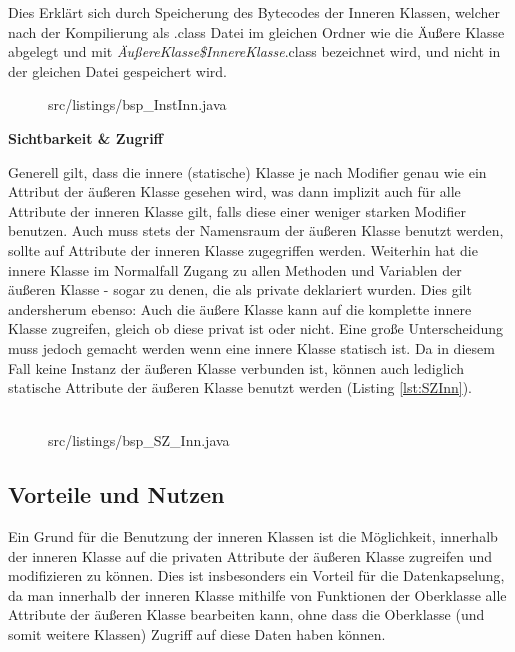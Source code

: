 Dies Erklärt sich durch Speicherung des Bytecodes der Inneren Klassen, welcher nach der Kompilierung als .class Datei im gleichen Ordner wie die Äußere Klasse abgelegt und mit {\it ÄußereKlasse\$InnereKlasse}.class bezeichnet wird, und nicht in der gleichen Datei gespeichert wird.

\begin{figure}[hbt]
\lstset{language=Java}
 {src/listings/bsp_InstInn.java}
\end{figure}

{\bf Sichtbarkeit \& Zugriff}

Generell gilt, dass die innere (statische) Klasse je nach Modifier genau wie ein Attribut der äußeren Klasse gesehen wird, was dann implizit auch für alle Attribute der inneren Klasse gilt, falls diese einer weniger starken Modifier benutzen.
Auch muss stets der Namensraum der äußeren Klasse benutzt werden, sollte auf Attribute der inneren Klasse zugegriffen werden.
Weiterhin hat die innere Klasse im Normalfall Zugang zu allen Methoden und Variablen der äußeren Klasse - sogar zu denen, die als private deklariert wurden.
Dies gilt andersherum ebenso: Auch die äußere Klasse kann auf die komplette innere Klasse zugreifen, gleich ob diese privat ist oder nicht.
Eine große Unterscheidung muss jedoch gemacht werden wenn eine innere Klasse statisch ist. Da in diesem Fall keine Instanz der äußeren Klasse verbunden ist, können auch lediglich statische Attribute der äußeren Klasse benutzt werden (Listing \ref{lst:SZInn}).
\\
\\
\begin{figure}[hbt]
\lstset{language=Java}
 {src/listings/bsp_SZ_Inn.java}
\end{figure}

\subsection{Vorteile und Nutzen}

Ein Grund für die Benutzung der inneren Klassen ist die Möglichkeit, innerhalb der inneren Klasse auf die privaten Attribute der äußeren Klasse zugreifen und modifizieren zu können.
Dies ist insbesonders ein Vorteil für die Datenkapselung, da man innerhalb der inneren Klasse mithilfe von Funktionen der Oberklasse alle Attribute der äußeren Klasse bearbeiten kann, ohne dass die Oberklasse (und somit weitere Klassen) Zugriff auf diese Daten haben können.

